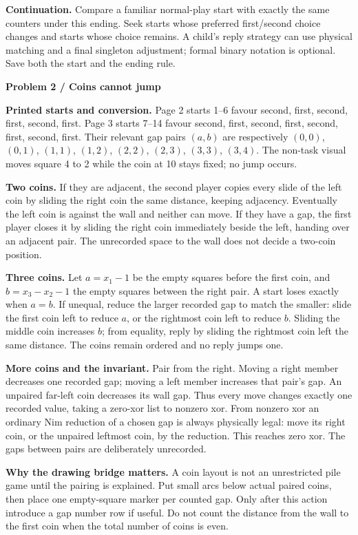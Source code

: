 \documentclass[11pt]{article}
\newcommand{\parttitle}[1]{{\large\bfseries\color{ink}#1}\par}
\newcommand{\labelled}[2]{\textbf{#1} #2\par}
\begin{document}
\labelled{Continuation.}{Compare a familiar normal-play start with exactly the same counters under this ending. Seek starts whose preferred first/second choice changes and starts whose choice remains. A child's reply strategy can use physical matching and a final singleton adjustment; formal binary notation is optional. Save both the start and the ending rule.}
\newpage
\parttitle{Problem 2 / Coins cannot jump}
\labelled{Printed starts and conversion.}{Page 2 starts 1--6 favour second, first, second, first, second, first. Page 3 starts 7--14 favour second, first, second, first, second, first, second, first. Their relevant gap pairs $(a,b)$ are respectively $(0,0)$, $(0,1)$, $(1,1)$, $(1,2)$, $(2,2)$, $(2,3)$, $(3,3)$, $(3,4)$. The non-task visual moves square 4 to 2 while the coin at 10 stays fixed; no jump occurs.}
\labelled{Two coins.}{If they are adjacent, the second player copies every slide of the left coin by sliding the right coin the same distance, keeping adjacency. Eventually the left coin is against the wall and neither can move. If they have a gap, the first player closes it by sliding the right coin immediately beside the left, handing over an adjacent pair. The unrecorded space to the wall does not decide a two-coin position.}
\labelled{Three coins.}{Let $a=x_1-1$ be the empty squares before the first coin, and $b=x_3-x_2-1$ the empty squares between the right pair. A start loses exactly when $a=b$. If unequal, reduce the larger recorded gap to match the smaller: slide the first coin left to reduce $a$, or the rightmost coin left to reduce $b$. Sliding the middle coin increases $b$; from equality, reply by sliding the rightmost coin left the same distance. The coins remain ordered and no reply jumps one.}
\labelled{More coins and the invariant.}{Pair from the right. Moving a right member decreases one recorded gap; moving a left member increases that pair's gap. An unpaired far-left coin decreases its wall gap. Thus every move changes exactly one recorded value, taking a zero-xor list to nonzero xor. From nonzero xor an ordinary Nim reduction of a chosen gap is always physically legal: move its right coin, or the unpaired leftmost coin, by the reduction. This reaches zero xor. The gaps between pairs are deliberately unrecorded.}
\labelled{Why the drawing bridge matters.}{A coin layout is not an unrestricted pile game until the pairing is explained. Put small arcs below actual paired coins, then place one empty-square marker per counted gap. Only after this action introduce a gap number row if useful. Do not count the distance from the wall to the first coin when the total number of coins is even.}
\end{document}
